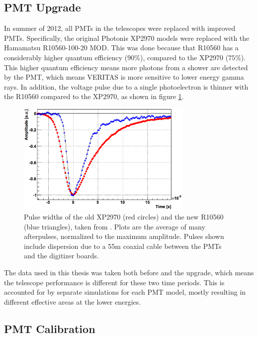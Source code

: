 \subsection{PMT Upgrade}
In summer of 2012, all PMTs in the telescopes were replaced with improved PMTs.
Specifically, the original Photonis XP2970 models were replaced with the Hamamatsu R10560-100-20 MOD.
This was done because that R10560 has a considerably higher quantum efficiency (\nicetilde$90\%$), compared to the XP2970 (\nicetilde$75\%$).
This higher quantum efficiency means more photons from a shower are detected by the PMT, which means VERITAS is more sensitive to lower energy gamma rays\cite{pmtmodels}.
In addition, the voltage pulse due to a single photoelectron is thinner with the R10560 compared to the XP2970, as shown in figure \ref{fig:pmt_pulse_widths}.

\begin{figure}[ht]
  \begin{center}
    \includegraphics[width=0.75\textwidth]{images/pmt_models_pulsewidths.eps}
    \caption[Pulse Widths]{Pulse widths of the old XP2970 (red circles) and the new R10560 (blue triangles), taken from \cite{pmtmodels}.  Plots are the average of many afterpulses, normalized to the maximum amplitude.  Pulses shown include dispersion due to a \nicetilde55m coaxial cable between the PMTs and the digitizer boards.}\label{fig:pmt_pulse_widths}
  \end{center}
\end{figure}

The data used in this thesis was taken both before and the upgrade, which means the telescope performance is different for these two time periods.
This is accounted for by separate simulations for each PMT model, mostly resulting in different effective areas at the lower energies.


\subsection{PMT Calibration}

